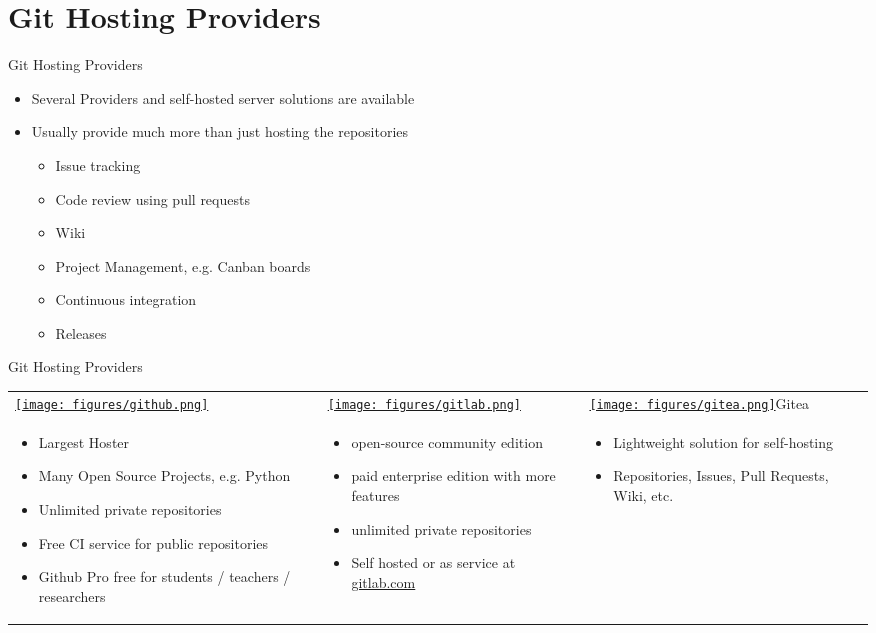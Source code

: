 \section{Git Hosting Providers}

\begin{frame}[c]{Git Hosting Providers}
  \begin{itemize}
    \item Several Providers and self-hosted server solutions are available
    \item Usually provide much more than just hosting the repositories
      \begin{itemize}
        \item Issue tracking
        \item Code review using pull requests
        \item Wiki
        \item Project Management, e.g. Canban boards
        \item Continuous integration
        \item Releases
      \end{itemize}
  \end{itemize}
\end{frame}

\begin{frame}[c]{Git Hosting Providers}
  \small
  \begin{tabu}{@{} X[,C] @{} X[,C] @{} X[,C] @{}}
    \href{https://github.com}{\texttt{[image: figures/github.png]}} &
    \href{https://gitlab.com}{\texttt{[image: figures/gitlab.png]}} &
    \href{https://gittea.io}{\texttt{[image: figures/gitea.png]}}\Huge Gitea \\
    \begin{itemize}
      \item Largest Hoster
      \item Many Open Source Projects, e.g. Python
      \item Unlimited private repositories
      \item Free CI service for public repositories
      \item Github Pro free for students / teachers / researchers
    \end{itemize}
    &
    \begin{itemize}
      \item open-source community edition
      \item paid enterprise edition with more features
      \item unlimited private repositories
      \item Self hosted or as service at \href{https://gitlab.com}{gitlab.com}
    \end{itemize}
    &
    \begin{itemize}
      \item Lightweight solution for self-hosting
      \item Repositories, Issues, Pull Requests, Wiki, etc.
    \end{itemize}
  \end{tabu}
\end{frame}

